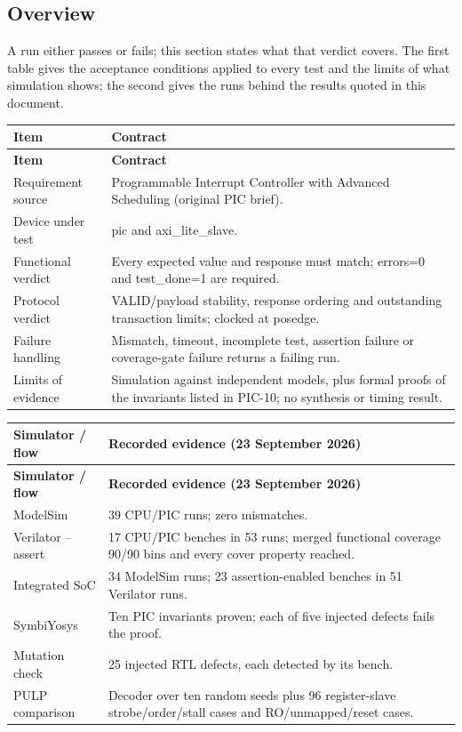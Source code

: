 \documentclass[11pt]{article}
\begin{document}
\subsection{Overview}
\noindent A run either passes or fails; this section states what that verdict covers. The first table gives the acceptance conditions applied to every test and the limits of what simulation shows; the second gives the runs behind the results quoted in this document.\par\medskip
{\small
\begin{longtable}{@{}L{0.2900\dimexpr\linewidth-12pt\relax}L{0.7100\dimexpr\linewidth-12pt\relax}@{}}
\toprule
\textbf{Item} & \textbf{Contract} \\ \midrule
\endfirsthead
\toprule
\textbf{Item} & \textbf{Contract} \\ \midrule
\endhead
Requirement source & Programmable Interrupt Controller with Advanced Scheduling (original PIC brief). \\ \addlinespace[3pt]
Device under test & pic and axi\_lite\_slave. \\ \addlinespace[3pt]
Functional verdict & Every expected value and response must match; errors=0 and test\_done=1 are required. \\ \addlinespace[3pt]
Protocol verdict & VALID/payload stability, response ordering and outstanding transaction limits; clocked at posedge. \\ \addlinespace[3pt]
Failure handling & Mismatch, timeout, incomplete test, assertion failure or coverage-gate failure returns a failing run. \\ \addlinespace[3pt]
Limits of evidence & Simulation against independent models, plus formal proofs of the invariants listed in PIC-10; no synthesis or timing result. \\*
\bottomrule\end{longtable}}
{\small
\begin{longtable}{@{}L{0.2900\dimexpr\linewidth-12pt\relax}L{0.7100\dimexpr\linewidth-12pt\relax}@{}}
\toprule
\textbf{Simulator / flow} & \textbf{Recorded evidence (23 September 2026)} \\ \midrule
\endfirsthead
\toprule
\textbf{Simulator / flow} & \textbf{Recorded evidence (23 September 2026)} \\ \midrule
\endhead
ModelSim & 39 CPU/PIC runs; zero mismatches. \\ \addlinespace[3pt]
Verilator --assert & 17 CPU/PIC benches in 53 runs; merged functional coverage 90/90 bins and every cover property reached. \\ \addlinespace[3pt]
Integrated SoC & 34 ModelSim runs; 23 assertion-enabled benches in 51 Verilator runs. \\ \addlinespace[3pt]
SymbiYosys & Ten PIC invariants proven; each of five injected defects fails the proof. \\ \addlinespace[3pt]
Mutation check & 25 injected RTL defects, each detected by its bench. \\ \addlinespace[3pt]
PULP comparison & Decoder over ten random seeds plus 96 register-slave strobe/order/stall cases and RO/unmapped/reset cases. \\*
\bottomrule\end{longtable}}
\end{document}
